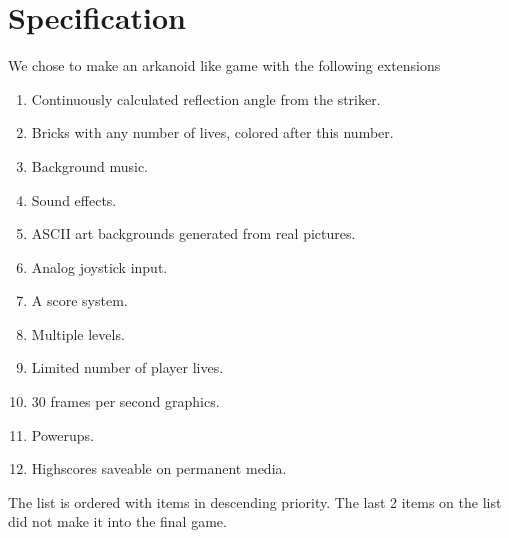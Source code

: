 \section{Specification}
We chose to make an arkanoid like game with the following extensions

\begin{enumerate}
\item Continuously calculated reflection angle from the striker.
\item Bricks with any number of lives, colored after this number.
\item Background music.
\item Sound effects.
\item ASCII art backgrounds generated from real pictures.
\item Analog joystick input.
\item A score system.
\item Multiple levels.
\item Limited number of player lives.
\item 30 frames per second graphics.
\item Powerups.
\item Highscores saveable on permanent media.
\end{enumerate}

The list is ordered with items in descending priority. The last 2 items on the list
did not make it into the final game.
